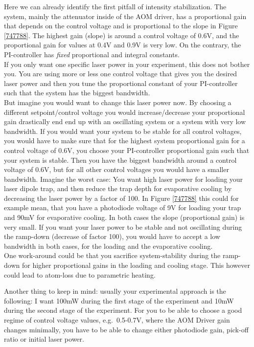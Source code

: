 \documentclass[10pt]{article}
\begin{document}
Here we can already identify the first pitfall of intensity
stabilization. The system, mainly the attenuator inside of the AOM
driver, has a proportional gain that depends on the control voltage and
is proportional to the slope in Figure \ref{747788}. The highest gain
(slope) is around a control voltage of 0.6V, and the proportional gain
for values at 0.4V and 0.9V is very low. On the contrary, the
PI-controller has \emph{fixed} proportional and integral constants.\\
If you only want one specific laser power in your experiment, this does
not bother you. You are using more or less one control voltage that
gives you the desired laser power and then you tune the proportional
constant of your PI-controller such that the system has the biggest
bandwidth.\\
But imagine you would want to change this laser power now. By choosing a
different setpoint/control voltage you would increase/decrease your
proportional gain drastically end end up with an oscillating system or a
system with very low bandwidth. If you would want your system to be
stable for all control voltages, you would have to make sure that for
the highest system proportional gain for a control voltage of 0.6V, you
choose your PI-controller proportional gain such that your system is
stable. Then you have the biggest bandwidth around a control voltage of
0.6V, but for all other control voltages you would have a smaller
bandwidth. Imagine the worst case: You want high laser power for loading
your laser dipole trap, and then reduce the trap depth for evaporative
cooling by decreasing the laser power by a factor of 100. In Figure
\ref{747788} this could for example mean, that you have a photodiode
voltage of 9V for loading your trap and 90mV for evaporative cooling. In
both cases the slope (proportional gain) is very small. If you want your
laser power to be stable and not oscillating during the ramp-down
(decrease of factor 100), you would have to accept a low bandwidth in
both cases, for the loading and the evaporative cooling.\\
One work-around could be that you sacrifice system-stability during the
ramp-down for higher proportional gains in the loading and cooling
stage. This however could lead to atom-loss due to parametric heating.

Another thing to keep in mind: usually your experimental approach is the
following: I want 100mW during the first stage of the experiment and
10mW during the second stage of the experiment. For you to be able to
choose a good regime of control voltage values, e.g.~0.5-0.7V, where the
AOM Driver gain changes minimally, you have to be able to change either
photodiode gain, pick-off ratio or initial laser power.
\end{document}
